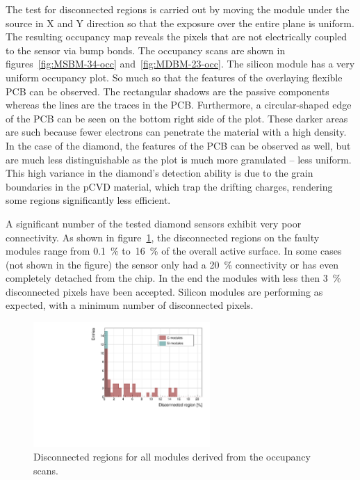 The test for disconnected regions is carried out by moving the module under the source in X and Y direction so that the exposure over the entire plane is uniform. The resulting occupancy map reveals the pixels that are not electrically coupled to the sensor via bump bonds. The occupancy scans are shown in figures~\ref{fig:MSBM-34-occ} and~\ref{fig:MDBM-23-occ}. The silicon module has a very uniform occupancy plot. So much so that the features of the overlaying flexible PCB can be observed. The rectangular shadows are the passive components whereas the lines are the traces in the PCB. Furthermore, a circular-shaped edge of the PCB can be seen on the bottom right side of the plot. These darker areas are such because fewer electrons can penetrate the material with a high density. In the case of the diamond, the features of the PCB can be observed as well, but are much less distinguishable as the plot is much more granulated -- less uniform. This high variance in the diamond's detection ability is due to the grain boundaries in the pCVD material, which trap the drifting charges, rendering some regions significantly less efficient. 

A significant number of the tested diamond sensors exhibit very poor connectivity. As shown in figure~\ref{fig:disconreg}, the disconnected regions on the faulty modules range from 0.1~\% to~16~\% of the overall active surface. In some cases (not shown in the figure) the sensor only had a 20~\% connectivity or has even completely detached from the chip. In the end the modules with less then 3~\% disconnected pixels have been accepted. Silicon modules are performing as expected, with a minimum number of disconnected pixels.


\begin{figure}[!t]
\centering
\includegraphics[width=0.6\textwidth]{../scripts/04_charge_monitoring/plots/disconnectedregion1} \caption{Disconnected regions for all modules derived from the occupancy scans.}
\label{fig:disconreg}
\end{figure}






